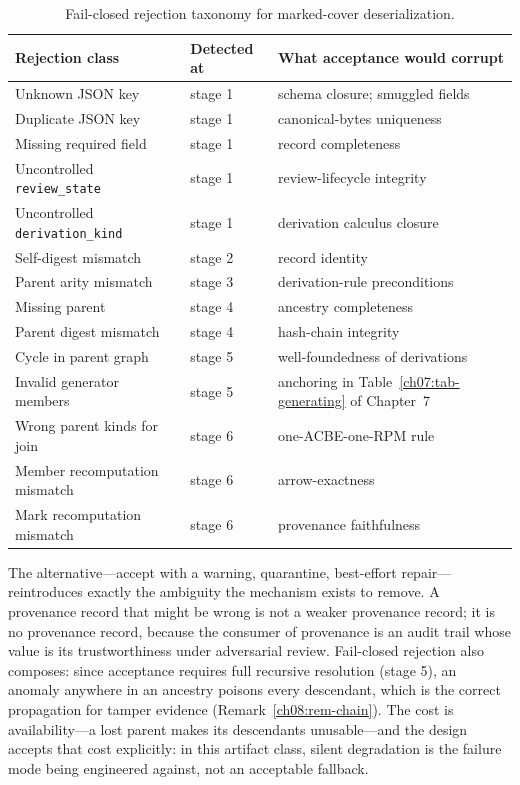 \begin{table}[htbp]
\centering
\caption{Fail-closed rejection taxonomy for marked-cover deserialization.}
\label{ch08:tab-rejection}
\begin{tabular}{@{}lll@{}}
\toprule
Rejection class & Detected at & What acceptance would corrupt \\
\midrule
Unknown JSON key & stage 1 & schema closure; smuggled fields \\
Duplicate JSON key & stage 1 & canonical-bytes uniqueness \\
Missing required field & stage 1 & record completeness \\
Uncontrolled \texttt{review\_state} & stage 1 & review-lifecycle integrity \\
Uncontrolled \texttt{derivation\_kind} & stage 1 & derivation calculus closure \\
Self-digest mismatch & stage 2 & record identity \\
Parent arity mismatch & stage 3 & derivation-rule preconditions \\
Missing parent & stage 4 & ancestry completeness \\
Parent digest mismatch & stage 4 & hash-chain integrity \\
Cycle in parent graph & stage 5 & well-foundedness of derivations \\
Invalid generator members & stage 5 & anchoring in Table~\ref{ch07:tab-generating} of Chapter~7 \\
Wrong parent kinds for join & stage 6 & one-ACBE-one-RPM rule \\
Member recomputation mismatch & stage 6 & arrow-exactness \\
Mark recomputation mismatch & stage 6 & provenance faithfulness \\
\bottomrule
\end{tabular}
\end{table}

\begin{remark}\label{ch08:rem-failclosed}
The alternative---accept with a warning, quarantine, best-effort repair---reintroduces exactly the ambiguity the mechanism exists to remove. A provenance record that might be wrong is not a weaker provenance record; it is no provenance record, because the consumer of provenance is an audit trail whose value is its trustworthiness under adversarial review. Fail-closed rejection also composes: since acceptance requires full recursive resolution (stage 5), an anomaly anywhere in an ancestry poisons every descendant, which is the correct propagation for tamper evidence (Remark~\ref{ch08:rem-chain}). The cost is availability---a lost parent makes its descendants unusable---and the design accepts that cost explicitly: in this artifact class, silent degradation is the failure mode being engineered against, not an acceptable fallback.
\end{remark}

